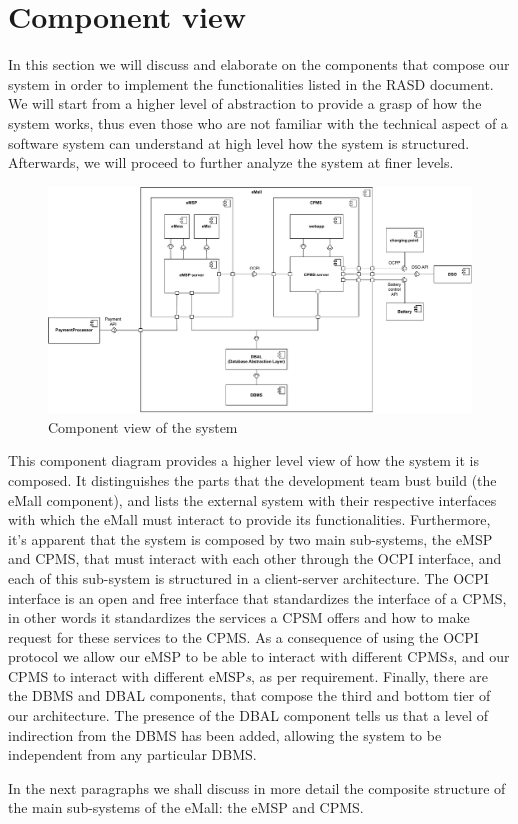\section{Component view}
\label{sec:component_view}
In this section we will discuss and elaborate on the components that compose our system in order to implement the functionalities listed in the RASD document. We will start from a higher level of abstraction to provide a grasp of how the system works, thus even those who are not familiar with the technical aspect of a software system can understand at high level how the system is structured. Afterwards, we will proceed to further analyze the system at finer levels.
\begin{figure}[H]
    \centering
    \includegraphics[width=1\textwidth]{Images/cp2/component_overview.pdf}
    \caption{Component view of the system}
\end{figure}

This component diagram provides a higher level view of how the system it is composed. It distinguishes the parts that the development team bust build (the eMall component), and lists the external system with their respective interfaces with which the eMall must interact to provide its functionalities. Furthermore, it's apparent that the system is composed by two main sub-systems, the eMSP and CPMS, that must interact with each other through the OCPI interface, and each of this sub-system is structured in a client-server architecture. The OCPI interface is an open and free interface that standardizes the interface of a CPMS, in other words it standardizes the services a CPSM offers and how to make request for these services to the CPMS. As a consequence of using the OCPI protocol we allow our eMSP to be able to interact with different CPMS\textit{s}, and our CPMS to interact with different eMSP\textit{s}, as per requirement. Finally, there are the DBMS and DBAL components, that compose the third and bottom tier of our architecture. The presence of the DBAL component tells us that a level of indirection from the DBMS has been added, allowing the system to be independent from any particular DBMS.
\par
In the next paragraphs we shall discuss in more detail the composite structure of the main sub-systems of the eMall: the eMSP and CPMS.
\pagebreak

